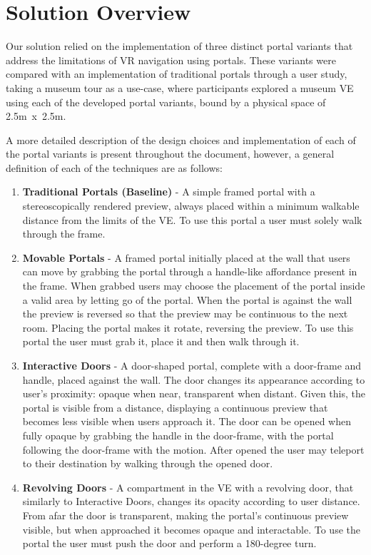 \section{Solution Overview}
\label{sec:solution-overview}

Our solution relied on the implementation of three distinct portal variants that address the limitations of \gls{VR} navigation using portals. 
These variants were compared with an implementation of traditional portals through a user study, taking a museum tour as a use-case, 
where participants explored a museum \gls{VE} using each of the developed portal variants, bound by a physical space of 2.5m~x~2.5m.

A more detailed description of the design choices and implementation of each of the portal variants is present throughout the document, however, a general 
definition of each of the techniques are as follows:

\begin{enumerate}
    \item \textbf{Traditional Portals (Baseline)} - A simple framed portal with a stereoscopically rendered preview, always placed within a minimum 
    walkable distance from the limits of the \gls{VE}. To use this portal a user must solely walk through the frame.
    
    \item \textbf{Movable Portals} - A framed portal initially placed at the wall that users can move by grabbing the portal through a handle-like
    affordance present in the frame. When grabbed users may choose the placement of the portal inside a valid area by letting go of the portal. 
    When the portal is against the wall the preview is reversed so that the preview may be continuous to the next room. Placing the portal makes 
    it rotate, reversing the preview. To use this portal the user must grab it, place it and then walk through it.
    
    \item \textbf{Interactive Doors} - A door-shaped portal, complete with a door-frame and handle, placed against the wall. The door changes its 
    appearance according to user's proximity: opaque when near, transparent when distant. Given this, the portal is visible from a distance, displaying a
    continuous preview that becomes less visible when users approach it. The door can be opened when fully opaque by grabbing the handle in the door-frame, 
    with the portal following the door-frame with the motion. After opened the user may teleport to their destination by walking through the opened door.
     
    \item \textbf{Revolving Doors} - A compartment in the \gls{VE} with a revolving door, that similarly to Interactive Doors, changes its opacity 
    according to user distance. From afar the door is transparent, making the portal's continuous preview visible, but when approached it becomes 
    opaque and interactable. To use the portal the user must push the door and perform a 180-degree turn.
\end{enumerate}

